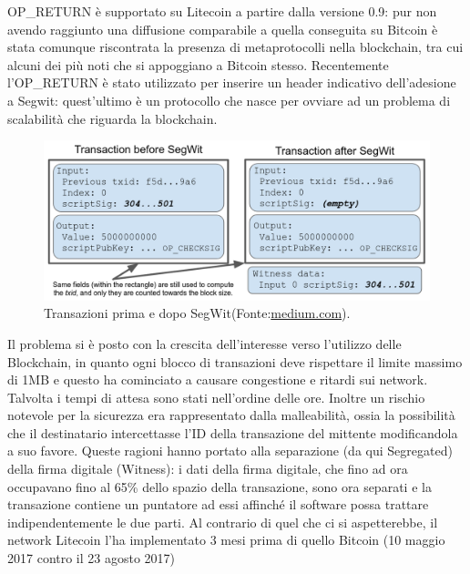 OP\_RETURN è supportato su Litecoin a partire dalla versione 0.9: pur non avendo raggiunto una diffusione comparabile a quella conseguita su Bitcoin è stata comunque riscontrata la presenza di metaprotocolli nella blockchain, tra cui alcuni dei più noti che si appoggiano a Bitcoin stesso.
Recentemente l’OP\_RETURN è stato utilizzato per inserire un header indicativo dell’adesione a Segwit: quest’ultimo è un protocollo che nasce per ovviare ad un problema di scalabilità che riguarda la blockchain.

\begin{figure}[h!]
	\centering
	\includegraphics[width=1.0\linewidth]{images/before-after-segwit-medium}
	\caption{Transazioni prima e dopo SegWit(Fonte:\url{medium.com}).}
	\label{fig:before-after-segwit-medium}
\end{figure}


Il problema si è posto con la crescita dell’interesse verso l’utilizzo delle Blockchain, in quanto ogni blocco di transazioni deve rispettare il limite massimo di 1MB e questo ha cominciato a causare congestione e ritardi sui network. Talvolta i tempi di attesa sono stati nell’ordine delle ore. Inoltre un rischio notevole per la sicurezza era rappresentato dalla malleabilità, ossia la possibilità che il destinatario intercettasse l’ID della transazione del mittente modificandola a suo favore. Queste ragioni hanno portato alla separazione (da qui Segregated) della firma digitale (Witness): i dati della firma digitale, che fino ad ora occupavano fino al 65\% dello spazio della transazione, sono ora separati e la transazione contiene un puntatore ad essi affinché il software possa trattare indipendentemente le due parti. Al contrario di quel che ci si aspetterebbe, il network Litecoin l'ha implementato 3 mesi prima di quello Bitcoin (10 maggio 2017 contro il 23 agosto 2017)



